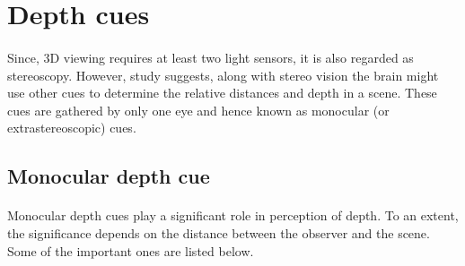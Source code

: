 \section{Depth cues}

\paragraph{}
Since, 3D viewing requires at least two light sensors, it is also regarded as stereoscopy. However, study
\cite{bib:stereo_cue} suggests, along with stereo vision the brain might use other cues to determine the relative distances and depth in a scene. These cues are gathered by only one eye and hence known as monocular (or extrastereoscopic) cues. 

\subsection{Monocular depth cue}
\paragraph{}
Monocular depth cues play a significant role in perception of depth. To an extent, the significance  depends on the distance between the observer and the scene. Some of the important ones are listed below.

